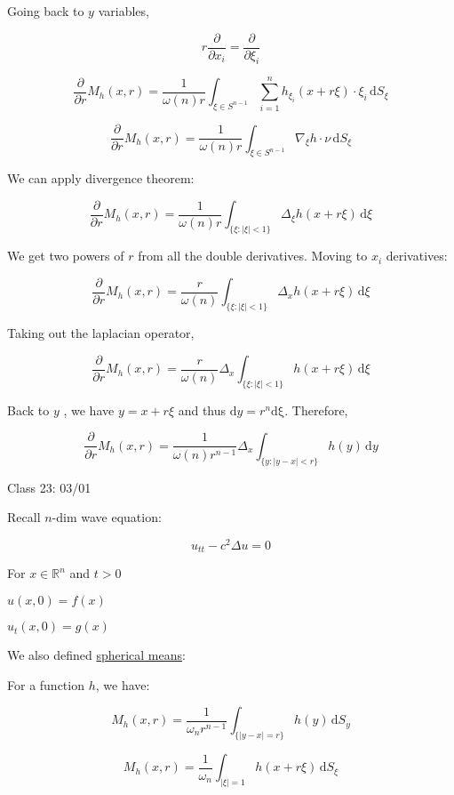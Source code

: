 \documentclass{article}
\theoremstyle{definition}
\begin{document}
Going back to \(y\) variables,

\[
    r \frac{\partial}{\partial x_i} = \frac{\partial}{\partial \xi_i} 
\]

\[
    \frac{\partial}{\partial r} M_h(x,r) = \frac{1}{\omega(n)r} \int_{\xi\in S^{n-1}}^{} \sum_{i=1}^{n} h_{\xi_i} (x+r\xi)\cdot\xi_i\,\mathrm{d}S_\xi 
\]

\[
    \frac{\partial}{\partial r} M_h(x,r) = \frac{1}{\omega(n)r} \int_{\xi\in S^{n-1}}^{} \nabla_\xi h\cdot\nu \,\mathrm{d}S_\xi 
\]

We can apply divergence theorem:

\[
    \frac{\partial}{\partial r} M_h(x,r) = \frac{1}{\omega(n)r} \int_{\{ \xi: \vert \xi \vert < 1 \} }^{} \Delta_\xi h(x+r\xi) \,\mathrm{d}\xi 
\]

We get two powers of \(r\) from all the double derivatives. Moving to \(x_i\) derivatives:

\[
    \frac{\partial}{\partial r} M_h(x,r) = \frac{r}{\omega(n)} \int_{\{ \xi : \vert \xi \vert < 1 \} }^{} \Delta_x h(x+r\xi) \,\mathrm{d}\xi 
\]

Taking out the laplacian operator,

\[
    \frac{\partial}{\partial r} M_h(x,r) = \frac{r}{\omega(n)} \Delta _x \int_{\{ \xi : \vert \xi \vert < 1 \} }^{} h(x+r\xi) \,\mathrm{d}\xi 
\]

Back to \(y\) , we have \(y = x + r\xi\) and thus \(\mathrm{d} y = r^n \mathrm{d\xi} \). Therefore,

\[
    \frac{\partial}{\partial r} M_h(x,r) = \frac{1}{\omega(n) r^{n-1}} \Delta_x \int_{\{ y : \vert y - x \vert < r \} }^{} h(y) \,\mathrm{d}y 
\]

\hrulefill

Class 23: 03/01

Recall \(n\)-dim wave equation:

\[
    u_{t t} - c^2 \Delta u = 0
\]

For \(x\in\mathbb{R}^n\) and \(t>0\) 

\(u(x,0)=f(x)\) 

\(u_t(x,0)=g(x)\) 

We also defined \underline{spherical means}:

For a function \(h\), we have:

\[
    M_h(x,r) = \frac{1}{\omega_n r^{n-1}} \int_{\{ \vert y - x \vert = r \} }^{} h(y) \,\mathrm{d}S_y 
\]

\[
    M_h(x,r) = \frac{1}{\omega_n} \int_{\vert \xi \vert = 1}^{} h(x+r\xi) \,\mathrm{d}S_\xi 
\]
\end{document}
